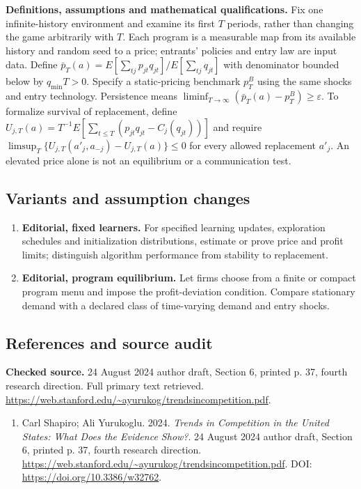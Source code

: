 \documentclass[11pt,a4paper]{article}
\begin{document}
\textbf{Definitions, assumptions and mathematical qualifications.} Fix one infinite-history environment and examine its first \(T\) periods, rather than changing the game arbitrarily with \(T\). Each program is a measurable map from its available history and random seed to a price; entrants' policies and entry law are input data. Define \(\bar p_T(a)=E[\sum_{tj}p_{jt}q_{jt}]/E[\sum_{tj}q_{jt}]\) with denominator bounded below by \(q_{\min}T>0\). Specify a static-pricing benchmark \(p_T^B\) using the same shocks and entry technology. Persistence means \(\liminf_{T\to\infty}(\bar p_T(a)-p_T^B)\geq\varepsilon\). To formalize survival of replacement, define \(U_{j,T}(a)=T^{-1}E[\sum_{t\leq T}(p_{jt}q_{jt}-C_j(q_{jt}))]\) and require \(\limsup_T\{U_{j,T}(a'_j,a_{-j})-U_{j,T}(a)\}\leq0\) for every allowed replacement \(a'_j\). An elevated price alone is not an equilibrium or a communication test.
\subsection*{Variants and assumption changes}
\begin{enumerate}
\item \textbf{Editorial, fixed learners.} For specified learning updates, exploration schedules and initialization distributions, estimate or prove price and profit limits; distinguish algorithm performance from stability to replacement.
\item \textbf{Editorial, program equilibrium.} Let firms choose from a finite or compact program menu and impose the profit-deviation condition. Compare stationary demand with a declared class of time-varying demand and entry shocks.
\end{enumerate}
\subsection*{References and source audit}
\textbf{Checked source.} 24 August 2024 author draft, Section 6, printed p. 37, fourth research direction. Full primary text retrieved. \url{https://web.stanford.edu/~ayurukog/trendsincompetition.pdf}.
\begin{enumerate}\raggedright
\item\hypertarget{definitions:source:30007680:1}{} Carl Shapiro; Ali Yurukoglu. 2024. \emph{Trends in Competition in the United States: What Does the Evidence Show?}. 24 August 2024 author draft, Section 6, printed p. 37, fourth research direction.
\url{https://web.stanford.edu/~ayurukog/trendsincompetition.pdf}.
DOI: \url{https://doi.org/10.3386/w32762}.
\end{enumerate}
\end{document}
